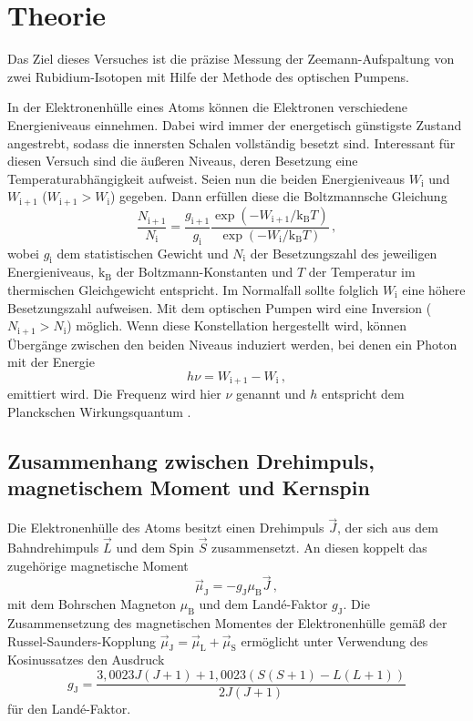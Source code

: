 \section{Theorie}
\label{sec:Theorie}
Das Ziel dieses Versuches ist die präzise Messung der Zeemann-Aufspaltung von zwei
Rubidium-Isotopen mit Hilfe der Methode des optischen Pumpens.

In der Elektronenhülle eines Atoms können die Elektronen verschiedene Energieniveaus einnehmen.
Dabei wird immer der energetisch günstigste Zustand angestrebt, sodass die innersten Schalen
vollständig besetzt sind. Interessant für diesen Versuch sind die äußeren Niveaus, deren
Besetzung eine Temperaturabhängigkeit aufweist. Seien nun die beiden Energieniveaus
$W_{\mathrm{i}}$ und $W_{\mathrm{i}+1}$ ($W_{\mathrm{i}+1} >  W_{\mathrm{i}}$) gegeben.
Dann erfüllen diese die Boltzmannsche Gleichung
\begin{equation}
	\frac{N_{\mathrm{i}+1}}{N_{\mathrm{i}}} = \frac{g_{\mathrm{i}+1}}{g_{\mathrm{i}}} \frac{\exp(-W_{\mathrm{i}+1} / \mathrm{k}_{\mathrm{B}}T)}{\exp(-W_{\mathrm{i}} / \mathrm{k}_{\mathrm{B}}T)} \, \mathrm{,}
\end{equation}
wobei $g_{\mathrm{i}}$ dem statistischen Gewicht und $N_{\mathrm{i}}$ der Besetzungszahl
des jeweiligen Energieniveaus,
$\mathrm{k}_{\mathrm{B}}$ der Boltzmann-Konstanten \cite{k_b} und $T$ der Temperatur im thermischen
Gleichgewicht entspricht.
Im Normalfall sollte folglich $W_{\mathrm{i}}$ eine höhere Besetzungszahl aufweisen.
Mit dem optischen Pumpen wird eine Inversion ($N_{\mathrm{i}+1} > N_{\mathrm{i}}$) möglich.
Wenn diese Konstellation hergestellt wird, können Übergänge zwischen den beiden Niveaus
induziert werden, bei denen ein Photon mit der Energie
\begin{equation}
	h \nu = W_{\mathrm{i}+1} - W_{\mathrm{i}} \, \mathrm{,}
\end{equation}
emittiert wird. Die Frequenz wird hier $\nu$ genannt und $h$ entspricht dem Planckschen
Wirkungsquantum \cite{h}.

\subsection{Zusammenhang zwischen Drehimpuls, magnetischem Moment und Kernspin}

Die Elektronenhülle des Atoms besitzt einen Drehimpuls $\vec{J}$, der sich aus dem
Bahndrehimpuls $\vec{L}$ und dem Spin $\vec{S}$ zusammensetzt. An diesen koppelt das
zugehörige magnetische Moment
\begin{equation}
	\vec{\mu}_{\mathrm{J}} = - g_{\mathrm{J}} \mu_{\mathrm{B}} \vec{J} \, \mathrm{,}
\end{equation}
mit dem Bohrschen Magneton $\mu_{\mathrm{B}}$ \cite{mu_0} und dem Land\'{e}-Faktor $g_{\mathrm{J}}$.
Die Zusammensetzung des magnetischen Momentes der Elektronenhülle gemäß der
Russel-Saunders-Kopplung $\vec{\mu}_{\mathrm{J}} = \vec{\mu}_{\mathrm{L}} + \vec{\mu}_{\mathrm{S}}$ ermöglicht unter
Verwendung des Kosinussatzes den Ausdruck
\begin{equation}
	g_{\mathrm{J}} = \frac{3,0023 J(J+1) + 1,0023 (S(S+1)-L(L+1))}{2J(J+1)}
\end{equation}
für den Land\'{e}-Faktor.

